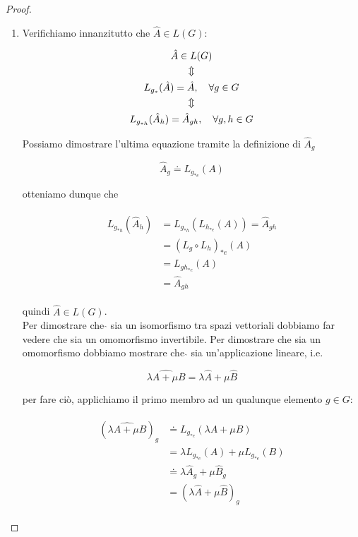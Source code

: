 \begin{proof}
	\begin{enumerate}
		\item Verifichiamo innanzitutto che $ \hat{A} \in L(G) $:
		
		\begin{gather}
			\hat{A} \in L(G)\nonumber\\%
			\Updownarrow\nonumber\\%
			L_{g_{*}}(\hat{A}) = \hat{A} \qcomma \forall g \in G\\%
			\Updownarrow\nonumber\\%
			L_{g_{*h}}(\hat{A}_{h}) = \hat{A}_{gh} \qcomma \forall g,h \in G\nonumber
		\end{gather}
	
		Possiamo dimostrare l'ultima equazione tramite la definizione di $ \hat{A}_{g} $
		
		\begin{equation}
			\hat{A}_{g} \doteq L_{g_{*e}}(A)
		\end{equation}
	
		otteniamo dunque che
		
		\begin{align}
			\begin{split}
				L_{g_{*h}}(\hat{A}_{h}) &= L_{g_{*h}}(L_{h_{*e}}(A)) = \hat{A}_{gh}\\
				&= (L_{g} \circ L_{h})_{*e} (A)\\
				&= L_{gh_{*e}} (A)\\
				&= \hat{A}_{gh}
			\end{split}
		\end{align}
	
		quindi $ \hat{A} \in L(G) $.\\
		Per dimostrare che $ \hat{} $ sia un isomorfismo tra spazi vettoriali dobbiamo far vedere che sia un omomorfismo invertibile. Per dimostrare che sia un omomorfismo dobbiamo mostrare che $ \hat{} $ sia un'applicazione lineare, i.e.
		
		\begin{equation}
			\widehat{\lambda A + \mu B} = \lambda \hat{A} + \mu \hat{B}
		\end{equation}
	
		per fare ciò, applichiamo il primo membro ad un qualunque elemento $ g \in G $:
	
		\begin{align}
			\begin{split}
				(\widehat{\lambda A + \mu B})_{g} &\doteq L_{g_{*e}} (\lambda A + \mu B)\\
				&= \lambda L_{g_{*e}} (A) + \mu L_{g_{*e}} (B)\\
				&\doteq \lambda \hat{A}_{g} + \mu \hat{B}_{g}\\
				&= (\lambda \hat{A} + \mu \hat{B})_{g}
			\end{split}
		\end{align}
	

\end{enumerate}
\end{proof}
